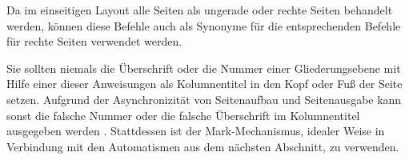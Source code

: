 \iftrue%
Da im einseitigen Layout alle Seiten als ungerade oder rechte Seiten behandelt
werden, können  diese Befehle auch als
Synonyme für die entsprechenden Befehle für rechte Seiten verwendet werden.%
\else%
Im einseitigen Layout können diese Befehle auch als Synonym für die
entsprechenden Befehle für rechte Seiten verwendet werden, da dann alle Seiten
rechte Seiten sind.%
\fi%
\iffalse%
In den meisten Fällen wird man daher eher diese sechs als die zwölf zuvor
vorgestellten Befehle verwenden.
\fi

%
Sie sollten niemals die Überschrift oder die Nummer einer Gliederungsebene mit
Hilfe einer dieser Anweisungen als Kolumnentitel in den Kopf oder Fuß der
Seite setzen. Aufgrund der Asynchronizität von Seitenaufbau und Seitenausgabe
kann %
\iffalse%
es sonst leicht geschehen, dass die falsche Nummer oder die falsche
Überschrift im Kolumnentitel ausgegeben wird%
\else%
sonst die falsche Nummer oder die falsche Überschrift im Kolumnentitel
ausgegeben werden%
\fi%
. Stattdessen ist der Mark-Mechanismus, idealer Weise in Verbindung mit den
Automatismen aus dem nächsten Abschnitt, zu verwenden.%
\EndIndexGroup


